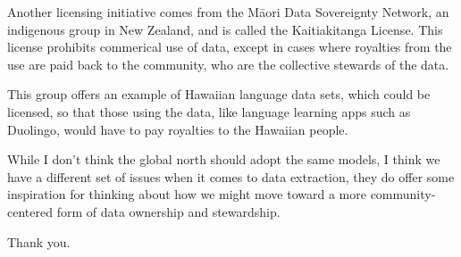 \documentclass[11pt]{article}
\begin{document}
Another licensing initiative comes from the Māori Data Sovereignty
Network, an indigenous group in New Zealand, and is called the
Kaitiakitanga License. This license prohibits commerical use of data,
except in cases where royalties from the use are paid back to the
community, who are the collective stewards of the data.

This group offers an example of Hawaiian language data sets, which
could be licensed, so that those using the data, like language
learning apps such as Duolingo, would have to pay royalties to the
Hawaiian people.

While I don't think the global north should adopt the same models, I
think we have a different set of issues when it comes to data
extraction, they do offer some inspiration for thinking about how we
might move toward a more community-centered form of data ownership and
stewardship.

Thank you.
\end{document}
